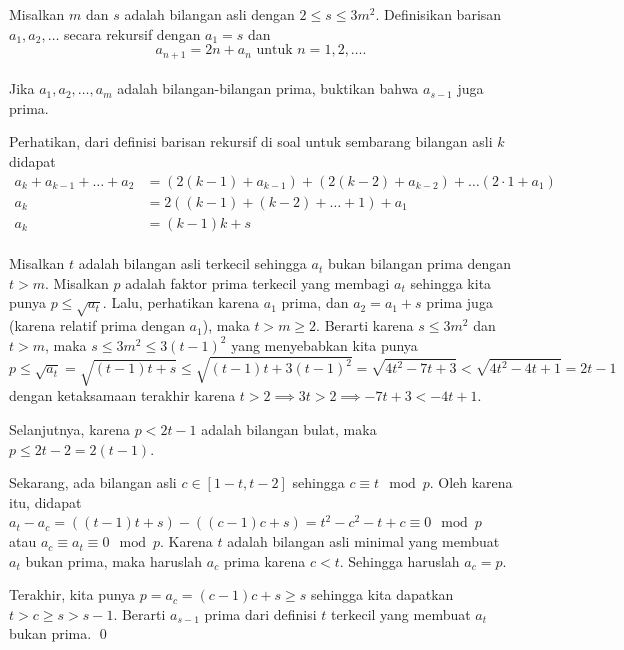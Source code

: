 \documentclass[12pt]{scrartcl}
\begin{document}
	\begin{soalbaru}
		Misalkan $m$ dan $s$ adalah bilangan asli dengan $2 \le s \le 3m^2.$ Definisikan barisan $a_1,a_2,\dots$ secara rekursif dengan $a_1=s$ dan \\[-18pt]$$a_{n+1} = 2n + a_n \text{    untuk   }  n=1,2,\dots.$$\\[-23pt]
		Jika $a_1,a_2,\dots,a_m$ adalah bilangan-bilangan prima, buktikan bahwa $a_{s-1}$ juga prima.\\[-10pt]
		\begin{solusi}
			Perhatikan, dari definisi barisan rekursif di soal untuk sembarang bilangan asli $k$ didapat\\[-23pt]
			\begin{align*}
				a_{k}+a_{k-1}+\dots+a_2 &= (2(k-1)+a_{k-1})+(2(k-2)+a_{k-2})+\dots (2\cdot 1+a_1)\\
				a_k &= 2((k-1)+(k-2)+\dots+1)+a_1\\
				a_k &= (k-1)k + s
			\end{align*}\\[-25pt] 
			Misalkan $t$ adalah bilangan asli terkecil sehingga $a_t$ bukan bilangan prima dengan $t > m$. Misalkan $p$ adalah faktor prima terkecil yang membagi $a_t$ sehingga kita punya $p \le \sqrt{a_t}$. Lalu, perhatikan karena $a_1 $ prima, dan $a_2 = a_1 +s$ prima juga (karena relatif prima dengan $a_1$), maka $t>m \ge 2$. Berarti karena $s \le 3m^2$ dan $t > m$, maka $ s \le 3m^2 \le 3(t-1)^2$ yang menyebabkan kita punya 
			$$p \le \sqrt{a_t} = \sqrt{(t-1)t+s}\le \sqrt{(t-1)t+3(t-1)^2} = \sqrt{4t^2-7t+3} < \sqrt{4t^2-4t+1} = 2t-1$$dengan ketaksamaan terakhir karena $t > 2 \implies 3t > 2 \implies -7t+3 < -4t+1$.
			
			Selanjutnya, karena $p<2t-1$ adalah bilangan bulat, maka $p \le 2t-2 = 2(t-1)$. 
			
			Sekarang, ada bilangan asli $c \in [1-t,t-2]$ sehingga $c \equiv t \mod p$. Oleh karena itu, didapat $a_t - a_c = ((t-1)t+s)-((c-1)c+s) = t^2 - c^2 - t+c \equiv 0 \mod p$ atau $a_c \equiv a_t \equiv 0 \mod p$. Karena $t$ adalah bilangan asli minimal yang membuat $a_t$ bukan prima, maka haruslah $a_c$ prima karena $c<t$. Sehingga haruslah $a_c = p$.
			
			Terakhir, kita punya $p=a_c=(c-1)c+s \ge s$ sehingga kita dapatkan $t > c \ge s > s-1$. Berarti $a_{s-1}$ prima dari definisi $t$ terkecil yang membuat $a_t$ bukan prima. \qed
		\end{solusi}
		
	\end{soalbaru}
\end{document}
